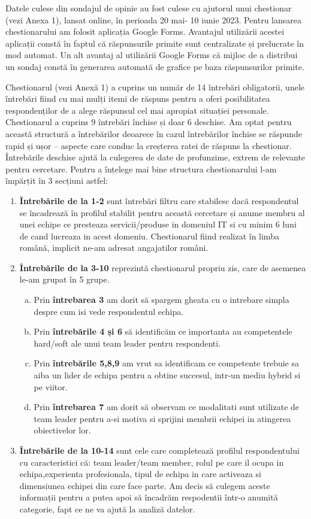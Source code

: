 \documentclass[a4paper, 12pt]{article}
\begin{document}
	\quad Datele culese din sondajul de opinie au fost culese cu ajutorul unui chestionar (vezi Anexa 1), lansat online, în perioada 20 mai- 10 iunie 2023. Pentru lansarea chestionarului am folosit aplicația Google Forms. Avantajul utilizării acestei aplicații constă în faptul că răspunsurile primite sunt centralizate și prelucrate în mod automat. Un alt avantaj al utilizării Google Forms că mijloc de a distribui un sondaj constă în generarea automată de grafice pe baza răspunsurilor primite. 	

	\quad Chestionarul (vezi Anexă 1) a cuprins un număr de 14 întrebări obligatorii, unele întrebări fiind cu mai mulți itemi de răspuns pentru a oferi posibilitatea respondenților de a alege răspunsul cel mai apropiat situației personale. Chestionarul a cuprins 9 întrebări închise și doar 6 deschise. Am optat pentru această structură a întrebărilor deoarece în cazul întrebărilor închise se răspunde rapid și ușor – aspecte care conduc la creșterea ratei de răspuns la chestionar. Întrebările deschise  ajută la culegerea de date de profunzime, extrem de relevante pentru cercetare.  Pentru a înțelege mai bine structura chestionarului l-am împărțit în 3 secțiuni astfel:

\begin{enumerate}[(1)]
			\item\textbf{Întrebările de la 1-2}  sunt întrebări filtru care stabilesc dacă respondentul se încadrează în profilul stabilit pentru această cercetare și anume membru al unei echipe ce presteaza servicii/produse in domeniul IT si cu minim 6 luni de cand lucreaza in acest domeniu. Chestionarul fiind realizat în limba română, implicit ne-am adresat angajatilor români. 
			\item\textbf{Întrebările de la 3-10} reprezintă chestionarul propriu zis, care de asemenea le-am grupat în 5 grupe.
		\begin{enumerate}[(a)]
			\item Prin \textbf{întrebarea 3} am dorit să spargem gheata cu o intrebare simpla despre cum isi vede respondentul echipa.
			\item Prin \textbf{întrebările 4 și 6} să identificăm ce importanta au competentele hard/soft ale unui team leader pentru respondenti.
			\item Prin \textbf{întrebările 5,8,9} am vrut sa identificam ce competente trebuie sa aiba un lider de echipa pentru a obtine succesul, intr-un mediu hybrid si pe viitor.
			\item Prin \textbf{întrebarea 7} am dorit să observam ce modalitati sunt utilizate de team leader pentru a-si motiva si sprijini membrii echipei in atingerea obiectivelor lor.
		\end{enumerate}
		\item\textbf{Întrebările de la 10-14} sunt cele care completează profilul respondentului cu caracteristici că: team leader/team member, rolul pe care il ocupa in echipa,experienta profesionala, tipul de echipa in care activeaza si dimensiunea echipei din care face parte. Am decis să culegem aceste informații pentru a putea apoi să încadrăm respodentii într-o anumită categorie, fapt ce ne va ajută la analiză datelor.
	\end{enumerate}
\end{document}
